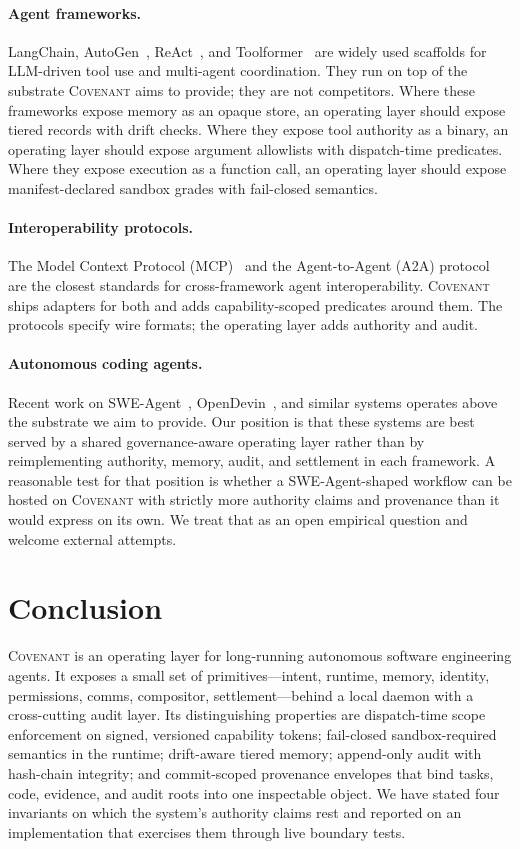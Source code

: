 \documentclass[11pt]{article}
\theoremstyle{plainsmall}
\begin{document}
\paragraph{Agent frameworks.} LangChain, AutoGen~\cite{autogen}, ReAct~\cite{react}, and Toolformer~\cite{toolformer} are widely used scaffolds for LLM-driven tool use and multi-agent coordination. They run on top of the substrate \textsc{Covenant} aims to provide; they are not competitors. Where these frameworks expose memory as an opaque store, an operating layer should expose tiered records with drift checks. Where they expose tool authority as a binary, an operating layer should expose argument allowlists with dispatch-time predicates. Where they expose execution as a function call, an operating layer should expose manifest-declared sandbox grades with fail-closed semantics.

\paragraph{Interoperability protocols.} The Model Context Protocol (MCP)~\cite{mcp} and the Agent-to-Agent (A2A) protocol~\cite{a2a} are the closest standards for cross-framework agent interoperability. \textsc{Covenant} ships adapters for both and adds capability-scoped predicates around them. The protocols specify wire formats; the operating layer adds authority and audit.

\paragraph{Autonomous coding agents.} Recent work on SWE-Agent~\cite{sweagent}, OpenDevin~\cite{opendevin}, and similar systems operates above the substrate we aim to provide. Our position is that these systems are best served by a shared governance-aware operating layer rather than by reimplementing authority, memory, audit, and settlement in each framework. A reasonable test for that position is whether a SWE-Agent-shaped workflow can be hosted on \textsc{Covenant} with strictly more authority claims and provenance than it would express on its own. We treat that as an open empirical question and welcome external attempts.

\section{Conclusion}
\label{sec:conclusion}

\textsc{Covenant} is an operating layer for long-running autonomous software engineering agents. It exposes a small set of primitives---intent, runtime, memory, identity, permissions, comms, compositor, settlement---behind a local daemon with a cross-cutting audit layer. Its distinguishing properties are dispatch-time scope enforcement on signed, versioned capability tokens; fail-closed sandbox-required semantics in the runtime; drift-aware tiered memory; append-only audit with hash-chain integrity; and commit-scoped provenance envelopes that bind tasks, code, evidence, and audit roots into one inspectable object. We have stated four invariants on which the system's authority claims rest and reported on an implementation that exercises them through live boundary tests.
\end{document}

